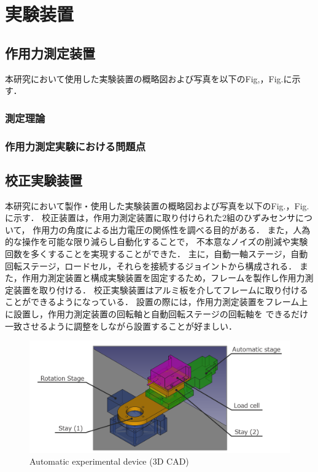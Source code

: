 \section{実験装置}

\subsection{作用力測定装置}
本研究において使用した実験装置の概略図および写真を以下のFig,，Fig.に示す．

\subsubsection{測定理論}

\subsubsection{作用力測定実験における問題点}

\subsection{校正実験装置}
本研究において製作・使用した実験装置の概略図および写真を以下のFig.，Fig.に示す．
校正装置は，作用力測定装置に取り付けられた2組のひずみセンサについて，
作用力の角度による出力電圧の関係性を調べる目的がある．
また，人為的な操作を可能な限り減らし自動化することで，
不本意なノイズの削減や実験回数を多くすることを実現することができた．
主に，自動一軸ステージ，自動回転ステージ，ロードセル，それらを接続するジョイントから構成される．
また，作用力測定装置と構成実験装置を固定するため，フレームを製作し作用力測定装置を取り付ける．
校正実験装置はアルミ板を介してフレームに取り付けることができるようになっている．
設置の際には，作用力測定装置をフレーム上に設置し，作用力測定装置の回転軸と自動回転ステージの回転軸を
できるだけ一致させるように調整をしながら設置することが好ましい．

\begin{figure}[htbp]
    \footnotesize
    \begin{center}
        \includegraphics[width=120mm]{images/21-1.png}
        \caption{Automatic experimental device (3D CAD)}
    \end{center}
\end{figure}

